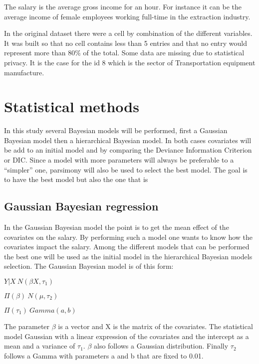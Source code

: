 \documentclass[]{article}
\begin{document}
The salary is the average gross income for an hour. For instance it can
be the average income of female employees working full-time in the
extraction industry.

In the original dataset there were a cell by combination of the
different variables. It was built so that no cell contains less than 5
entries and that no entry would represent more than 80\% of the total.
Some data are missing due to statistical privacy. It is the case for the
id 8 which is the sector of Transportation equipment manufacture.

\newpage

\section{Statistical methods}\label{statistical-methods}

In this study several Bayesian models will be performed, first a
Gaussian Bayesian model then a hierarchical Bayesian model. In both
cases covariates will be add to an initial model and by comparing the
Deviance Information Criterion or DIC. Since a model with more
parameters will always be preferable to a ``simpler'' one, parsimony
will also be used to select the best model. The goal is to have the best
model but also the one that is

\subsection{Gaussian Bayesian
regression}\label{gaussian-bayesian-regression}

In the Gaussian Bayesian model the point is to get the mean effect of
the covariates on the salary. By performing such a model one wants to
know how the covariates impact the salary. Among the different models
that can be performed the best one will be used as the initial model in
the hierarchical Bayesian models selection. The Gaussian Bayesian model
is of this form:

\begin{centering}

  $Y|X ~ N(\beta X,\tau_1)$
  
  $\Pi(\beta) ~ N(\mu,\tau_2)$
  
  $\Pi(\tau_1) ~ Gamma(a,b)$

\end{centering}

The parameter \(\beta\) is a vector and X is the matrix of the
covariates. The statistical model Gaussian with a linear expression of
the covariates and the intercept as a mean and a variance of \(\tau_1\).
\(\beta\) also follows a Gaussian distribution. Finally \(\tau_2\)
follows a Gamma with parameters a and b that are fixed to 0.01.
\end{document}
